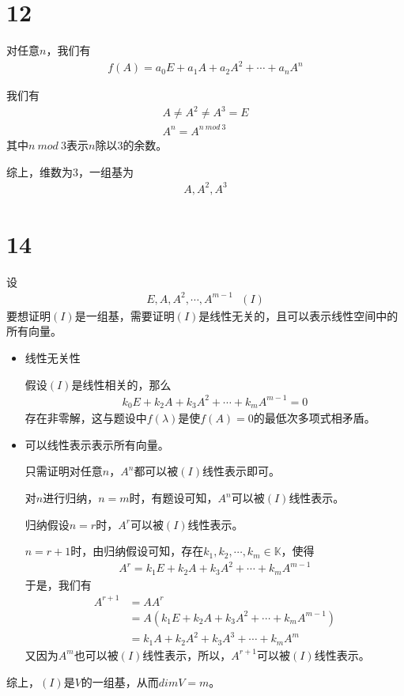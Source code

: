 \documentclass{article}
\begin{document}
\section*{12}

对任意$n$，我们有
\begin{align*}
  f(A) = a_0 E + a_1 A + a_2 A^2 + \cdots + a_n A^n
\end{align*}

我们有
\begin{align*}
  A \neq A^2 \neq A^3 = E \\
  A^n = A^{n \ mod \ 3}
\end{align*}
其中$n \ mod \ 3$表示$n$除以$3$的余数。

综上，维数为$3$，一组基为
\begin{align*}
  A, A^2, A^3
\end{align*}

\section*{14}

设
\begin{align*}
  E, A, A^2, \cdots, A^{m - 1} \ \ \ (I)
\end{align*}
要想证明$(I)$是一组基，需要证明$(I)$是线性无关的，且可以表示线性空间中的所有向量。

\begin{itemize}
  \item 线性无关性

        假设$(I)$是线性相关的，那么
        \begin{align*}
          k_0 E + k_2 A + k_3 A^2 + \cdots + k_m A^{m - 1} = 0
        \end{align*}
        存在非零解，这与题设中$f(\lambda)$是使$f(A) = 0$的最低次多项式相矛盾。

  \item 可以线性表示表示所有向量。

        只需证明对任意$n$，$A^n$都可以被$(I)$线性表示即可。

        对$n$进行归纳，$n = m$时，有题设可知，$A^n$可以被$(I)$线性表示。

        归纳假设$n = r$时，$A^r$可以被$(I)$线性表示。

        $n = r + 1$时，由归纳假设可知，存在$k_1, k_2, \cdots, k_m \in \mathbb{K}$，使得
        \begin{align*}
          A^r = k_1 E + k_2 A + k_3 A^2 + \cdots + k_m A^{m - 1}
        \end{align*}
        于是，我们有
        \begin{align*}
          A^{r + 1} & = A A^r                                                \\
                    & = A (k_1 E + k_2 A + k_3 A^2 + \cdots + k_m A^{m - 1}) \\
                    & = k_1 A + k_2 A^2 + k_3 A^3 + \cdots + k_m A^{m}
        \end{align*}
        又因为$A^m$也可以被$(I)$线性表示，所以，$A^{r + 1}$可以被$(I)$线性表示。
\end{itemize}
综上，$(I)$是$V$的一组基，从而$dim V = m$。
\end{document}

